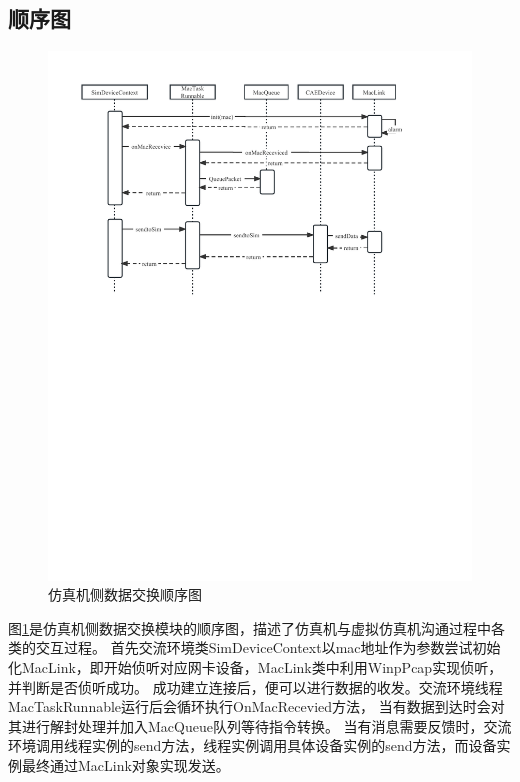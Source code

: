 \subsection{顺序图}
\begin{figure}[h!]
    \begin{center}
        \includegraphics[width=\textwidth]{pictures/sequence1.pdf}
        \caption{仿真机侧数据交换顺序图}
        \label{seq1}
    \end{center}
\end{figure}
\vspace{7pt}
图\ref{seq1}是仿真机侧数据交换模块的顺序图，描述了仿真机与虚拟仿真机沟通过程中各类的交互过程。
首先交流环境类SimDeviceContext以mac地址作为参数尝试初始化MacLink，即开始侦听对应网卡设备，MacLink类中利用WinpPcap实现侦听，并判断是否侦听成功。
成功建立连接后，便可以进行数据的收发。交流环境线程MacTaskRunnable运行后会循环执行OnMacRecevied方法，
当有数据到达时会对其进行解封处理并加入MacQueue队列等待指令转换。
当有消息需要反馈时，交流环境调用线程实例的send方法，线程实例调用具体设备实例的send方法，而设备实例最终通过MacLink对象实现发送。


